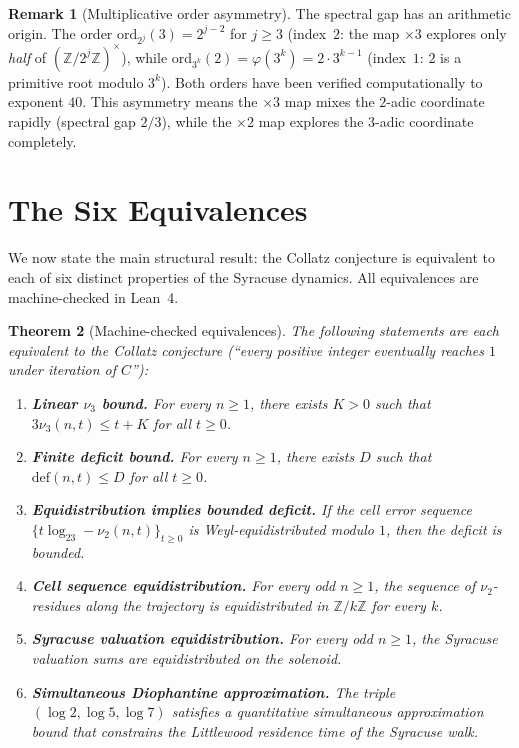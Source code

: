 \documentclass{CUP-JNL-FMP}%
\newtheorem{theorem}{Theorem}[section]
\theoremstyle{definition}
\newtheorem{remark}[theorem]{Remark}
\numberwithin{equation}{section}
\newcommand{\ZZ}{\mathbb{Z}}
\newcommand{\deficit}{\mathrm{def}}
\newcommand{\logb}{\log_2}
\begin{document}
\begin{remark}[Multiplicative order asymmetry]
  The spectral gap has an arithmetic origin.  The order
  $\mathrm{ord}_{2^j}(3) = 2^{j-2}$ for $j \geq 3$ (index~$2$: the map
  $\times 3$ explores only \emph{half} of $(\ZZ/2^j\ZZ)^\times$), while
  $\mathrm{ord}_{3^k}(2) = \varphi(3^k) = 2 \cdot 3^{k-1}$ (index~$1$:
  $2$ is a primitive root modulo $3^k$).  Both orders have been verified
  computationally to exponent $40$.  This asymmetry means the $\times 3$ map
  mixes the $2$-adic coordinate rapidly (spectral gap $2/3$), while the
  $\times 2$ map explores the $3$-adic coordinate completely.
\end{remark}


\section{The Six Equivalences}\label{sec:equivalences}

We now state the main structural result: the Collatz conjecture is equivalent to
each of six distinct properties of the Syracuse dynamics. All equivalences are
machine-checked in Lean~4.

\begin{theorem}[Machine-checked equivalences]\label{thm:equivalences}
  The following statements are each equivalent to the Collatz conjecture
  (``every positive integer eventually reaches $1$ under iteration of $C$''):
  \begin{enumerate}
    \item[\textbf{(P1)}] \textbf{Linear $\nu_3$ bound.}
      For every $n \geq 1$, there exists $K > 0$ such that
      $3\nu_3(n,t) \leq t + K$ for all $t \geq 0$.

    \item[\textbf{(P2)}] \textbf{Finite deficit bound.}
      For every $n \geq 1$, there exists $D$ such that
      $\deficit(n,t) \leq D$ for all $t \geq 0$.

    \item[\textbf{(P3)}] \textbf{Equidistribution implies bounded deficit.}
      If the cell error sequence $\{t \logb 3 - \nu_2(n,t)\}_{t \geq 0}$
      is Weyl-equidistributed modulo $1$, then the deficit is bounded.

    \item[\textbf{(P4)}] \textbf{Cell sequence equidistribution.}
      For every odd $n \geq 1$, the sequence of $\nu_2$-residues along the
      trajectory is equidistributed in $\ZZ/k\ZZ$ for every $k$.

    \item[\textbf{(P5)}] \textbf{Syracuse valuation equidistribution.}
      For every odd $n \geq 1$, the Syracuse valuation sums are
      equidistributed on the solenoid.

    \item[\textbf{(P6)}] \textbf{Simultaneous Diophantine approximation.}
      The triple $(\log 2, \log 5, \log 7)$ satisfies a quantitative
      simultaneous approximation bound that constrains the Littlewood
      residence time of the Syracuse walk.
  \end{enumerate}
\end{theorem}
\end{document}
